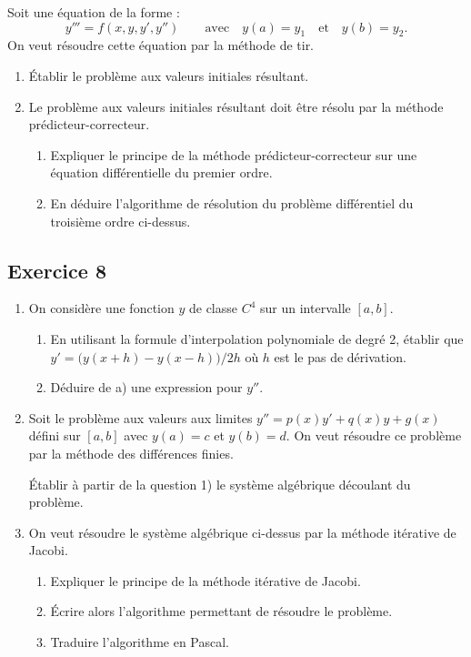 Soit une équation de la forme :
\[
  y''' = f(x, y, y', y'')
  \qquad\text{avec}\quad y(a) = y_1 \quad\text{et}\quad y(b) = y_2 .
\]
On veut résoudre cette équation par la méthode de tir.
\begin{enumerate}[label=\arabic*)-]
  \item Établir le problème aux valeurs initiales résultant.
  \item Le problème aux valeurs initiales résultant doit être résolu par la
        méthode prédicteur-correcteur.
        \begin{enumerate}[label=\alph*)-]
          \item Expliquer le principe de la méthode prédicteur-correcteur sur
                une équation différentielle du premier ordre.
          \item En déduire l'algorithme de résolution du problème
                différentiel du troisième ordre ci-dessus.
        \end{enumerate}
\end{enumerate}

\subsection*{Exercice 8}

\begin{enumerate}[label=\arabic*-]
  \item On considère une fonction $y$ de classe $C^4$ sur un intervalle
        $[a,b]$.
        \begin{enumerate}[label=\alph*-]
          \item En utilisant la formule d'interpolation polynomiale de degré 2,
                établir que $y' = \bigl(y(x+h) - y(x-h)\bigr)/2h$ où $h$ est
                le pas de dérivation.
          \item Déduire de a) une expression pour $y''$.
        \end{enumerate}
  \item Soit le problème aux valeurs aux limites
        $y'' = p(x)y' + q(x)y + g(x)$ défini sur $[a,b]$ avec $y(a) = c$ et
        $y(b) = d$. On veut résoudre ce problème par la méthode des
        différences finies.

        Établir à partir de la question 1) le système algébrique découlant du
        problème.
  \item On veut résoudre le système algébrique ci-dessus par la méthode
        itérative de Jacobi.
        \begin{enumerate}[label=\alph*-]
          \item Expliquer le principe de la méthode itérative de Jacobi.
          \item Écrire alors l'algorithme permettant de résoudre le problème.
          \item Traduire l'algorithme en Pascal.
        \end{enumerate}
\end{enumerate}


